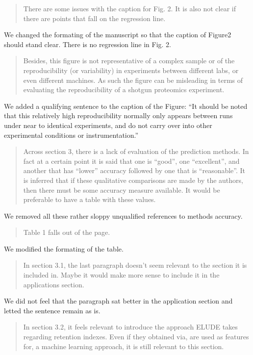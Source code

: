\documentclass[letterpaper]{article}
\newcommand{\breview}{\begin{quotation}\begin{bf}\noindent}
\newcommand{\ereview}{\end{bf}\end{quotation}}
\begin{document}
\breview

There are some issues with the caption for Fig. 2. It is also not clear if there are points that fall on the regression line. 
\ereview

We changed the formating of the manuscript so that the caption of Figure2 should stand clear. There is no regression line in Fig. 2.

\breview

Besides, this figure is not representative of a complex sample or of the reproducibility (or variability) in experiments between different labs, or even different machines. As such the figure can be misleading in terms of evaluating the reproducibility of a shotgun proteomics experiment.

\ereview

We added a qualifying sentence to the caption of the Figure: ``It
should be noted that this relatively high reproducibility normally
only appears between runs under near to identical experiments, and do
not carry over into other experimental conditions or instrumentation.''

\breview

Across section 3, there is a lack of evaluation of the prediction methods. In fact at a certain point it is said that one is ``good'', one ``excellent'', and another that has ``lower'' accuracy followed by one that is ``reasonable''. It is inferred that if these qualitative comparisons are made by the authors, then there must be some accuracy measure available. It would be preferable to have a table with these values.
\ereview

We removed all these rather sloppy unqualified references to methods accuracy.  

\breview

Table 1 falls out of the page.
\ereview
We modified the formating of the table.
\breview

In section 3.1, the last paragraph doesn’t seem relevant to the section it is included in. Maybe it would make more sense to include it in the applications section.
\ereview

We did not feel that the paragraph sat better in the application section and letted the sentence remain as is.

\breview

In section 3.2, it feels relevant to introduce the approach ELUDE takes regarding retention indexes. Even if they obtained via, are used as features for, a machine learning approach, it is still relevant to this section.
\ereview
\end{document}
